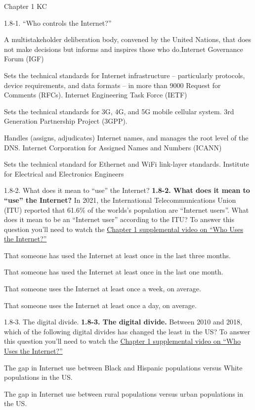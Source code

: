 \documentclass[a4paper]{article}
\begin{document}
\begin{quiz}{Chapter 1 KC}
\begin{matching}[points=1,shuffle=true]{1.8-1. ``Who controls the Internet?''}
\item A multistakeholder deliberation body, convened by the United Nations, that does not make decisions but informs and inspires those who do.\answer Internet Governance Forum (IGF) 
\item Sets the technical standards for Internet infrastructure -- particularly protocols, device requirements, and data formats -- in more than 9000 Request for Comments (RFCs). \answer Internet Engineering Task Force (IETF) 
\item Sets the technical standards for 3G, 4G, and 5G mobile cellular system. \answer 3rd Generation Partnership Project (3GPP). 
\item Handles (assigns, adjudicates) Internet names, and manages the root level of the DNS. \answer Internet Corporation for Assigned Names and Numbers (ICANN) 
\item Sets the technical standard for Ethernet and WiFi link-layer standards. \answer Institute for Electrical and Electronics Engineers
\end{matching}

\begin{multi}[points=1,shuffle=true]{1.8-2. What does it mean to ``use'' the Internet?}
\textbf{1.8-2. What does it mean to ``use'' the Internet?} 
In 2021, the International Telecommunications Union (ITU) reported that 61.6\% of the worlds's population are ``Internet users''.  What does it mean to be an ``Internet user'' according to the ITU? 
To answer this question you'll need to watch the \href{https://www.youtube.com/watch?v=-YaGGf8C1A4}{Chapter 1 supplemental video on ``Who Uses the Internet?''}
\item* That someone has used the Internet at least once in the last three months.
\item That someone has used the Internet at least once in the last one month.
\item That someone uses the Internet at least once a week, on average.
\item That someone uses the Internet at least once a day, on average.
\end{multi}

\begin{multi}[points=1,shuffle=true]{1.8-3. The digital divide.}
\textbf{1.8-3.  The digital divide.} 
Between 2010 and 2018, which of the following digital divides has changed the least in the US? 
To answer this question you'll need to watch the \href{https://www.youtube.com/watch?v=-YaGGf8C1A4}{Chapter 1 supplemental video on ``Who Uses the Internet?''}
\item* The gap in Internet use between Black and Hispanic populations versus White populations in the US.
\item The gap in Internet use between rural populations versus urban populations in the US.
\end{multi}

\end{quiz}
\end{document}
